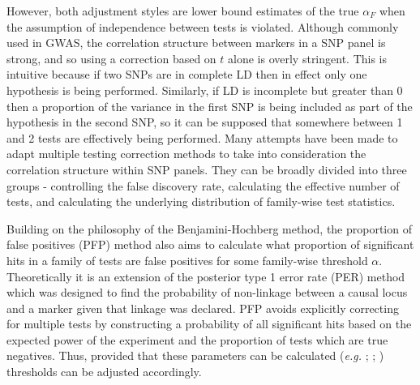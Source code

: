 However, both adjustment styles are lower bound estimates of the true $\alpha_{F}$ when the assumption of independence between tests is violated. Although commonly used in GWAS, the correlation structure between markers in a SNP panel is strong, and so using a correction based on $t$ alone is overly stringent. This is intuitive because if two SNPs are in complete LD then in effect only one hypothesis is being performed. Similarly, if LD is incomplete but greater than $0$ then a proportion of the variance in the first SNP is being included as part of the hypothesis in the second SNP, so it can be supposed that somewhere between 1 and 2 tests are effectively being performed. Many attempts have been made to adapt multiple testing correction methods to take into consideration the correlation structure within SNP panels. They can be broadly divided into three groups - controlling the false discovery rate, calculating the effective number of tests, and calculating the underlying distribution of family-wise test statistics.

Building on the philosophy of the Benjamini-Hochberg method, the proportion of false positives (PFP) method \citep{Fernando2004} also aims to calculate what proportion of significant hits in a family of tests are false positives for some family-wise threshold $\alpha$. Theoretically it is an extension of the posterior type 1 error rate (PER) method \citep{Morton1955} which was designed to find the probability of non-linkage between a causal locus and a marker given that linkage was declared. PFP avoids explicitly correcting for multiple tests by constructing a probability of all significant hits based on the expected power of the experiment and the proportion of tests which are true negatives. Thus, provided that these parameters can be calculated (\emph{e.g.} \citealt{Mosig2001}; \citealt{Allison2002}; \citealt{Storey2001}) thresholds can be adjusted accordingly.

